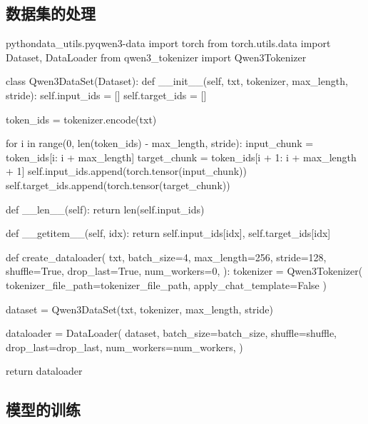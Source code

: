 \documentclass[lang=cn,newtx,10pt,scheme=chinese]{elegantbook}
\begin{document}
\subsection{数据集的处理}

\begin{codebox}{python}{data\_utils.py}{qwen3-data}
import torch
from torch.utils.data import Dataset, DataLoader
from qwen3_tokenizer import Qwen3Tokenizer

class Qwen3DataSet(Dataset):
    def __init__(self, txt, tokenizer, max_length, stride):
        self.input_ids = []
        self.target_ids = []

        token_ids = tokenizer.encode(txt)

        for i in range(0, len(token_ids) - max_length, stride):
            input_chunk = token_ids[i: i + max_length]
            target_chunk = token_ids[i + 1: i + max_length + 1]
            self.input_ids.append(torch.tensor(input_chunk))
            self.target_ids.append(torch.tensor(target_chunk))

    def __len__(self):
        return len(self.input_ids)

    def __getitem__(self, idx):
        return self.input_ids[idx], self.target_ids[idx]

def create_dataloader(
    txt,
    batch_size=4,
    max_length=256,
    stride=128,
    shuffle=True,
    drop_last=True,
    num_workers=0,
):
    tokenizer = Qwen3Tokenizer(
        tokenizer_file_path=tokenizer_file_path, apply_chat_template=False
    )

    dataset = Qwen3DataSet(txt, tokenizer, max_length, stride)

    dataloader = DataLoader(
        dataset,
        batch_size=batch_size,
        shuffle=shuffle,
        drop_last=drop_last,
        num_workers=num_workers,
    )

    return dataloader
\end{codebox}

\subsection{模型的训练}
\end{document}
